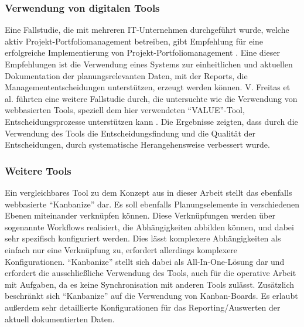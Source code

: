 \subsubsection{Verwendung von digitalen Tools}
Eine Fallstudie, die mit mehreren IT-Unternehmen durchgeführt wurde, welche aktiv Projekt-Portfoliomanagement betreiben, gibt Empfehlung für eine erfolgreiche Implementierung von Projekt-Portfoliomanagement \cite{guidelinesForPortfoliomanagement}.
Eine dieser Empfehlungen ist die Verwendung eines Systems zur einheitlichen und aktuellen Dokumentation der planungsrelevanten Daten, mit der Reports, die Managemententscheidungen unterstützen, erzeugt werden können.
V. Freitas et al. führten eine weitere Fallstudie durch, die untersuchte wie die Verwendung von webbasierten Tools, speziell dem hier verwendeten ``VALUE''-Tool, Entscheidungsprozesse unterstützen kann \cite{Value-Based-Decision-Making-Case-Study}. Die Ergebnisse zeigten, dass durch die Verwendung des Tools die Entscheidungsfindung und die Qualität der Entscheidungen, durch systematische Herangehensweise verbessert wurde.

\subsubsection{Weitere Tools}
Ein vergleichbares Tool zu dem Konzept aus in dieser Arbeit stellt das ebenfalls webbasierte ``Kanbanize'' dar. Es soll ebenfalls Planungselemente in verschiedenen Ebenen miteinander verknüpfen können. Diese Verknüpfungen werden über sogenannte Workflows realisiert, die Abhängigkeiten abbilden können, und dabei sehr spezifisch konfiguriert werden. Dies lässt komplexere Abhängigkeiten als einfach nur eine Verknüpfung zu, erfordert allerdings komplexere Konfigurationen. ``Kanbanize'' stellt sich dabei als All-In-One-Lösung dar und erfordert die ausschließliche Verwendung des Tools, auch für die operative Arbeit mit Aufgaben, da es keine Synchronisation mit anderen Tools zulässt. Zusätzlich beschränkt sich ``Kanbanize'' auf die Verwendung von Kanban-Boards. Es erlaubt außerdem sehr detaillierte Konfigurationen für das Reporting/Auswerten der aktuell dokumentierten Daten.
